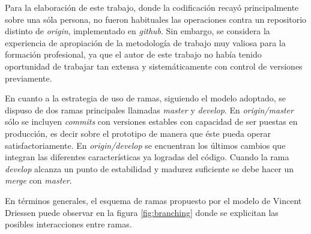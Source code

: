 
Para la elaboración de este trabajo, donde la codificación recayó principalmente sobre una sóla persona, no fueron habituales las operaciones contra un repositorio distinto de \textit{origin}, implementado en \textit{github}. Sin embargo, se considera la experiencia de apropiación de la metodología de trabajo muy valiosa para la formación profesional, ya que el autor de este trabajo no había tenido oportunidad de trabajar tan extensa y sistemáticamente con control de versiones previamente.

En cuanto a la estrategia de uso de ramas, siguiendo el modelo adoptado, se dispuso de dos ramas principales llamadas \textit{master} y \textit{develop}.  En \textit{origin/master} sólo se incluyen \textit{commits} con versiones estables con capacidad de ser puestas en producción, es decir sobre el prototipo de manera que éste pueda operar satisfactoriamente.  En \textit{origin/develop} se encuentran  los últimos cambios que integran las diferentes características ya logradas del código.  Cuando la rama \textit{develop} alcanza un punto de estabilidad y madurez suficiente se debe hacer un \textit{merge} con \textit{master}.%

En términos generales, el esquema de ramas propuesto por el modelo de Vincent Driessen puede observar en la figura  \ref{fig:branching} donde se explicitan las posibles interacciones entre ramas.

\vfill

